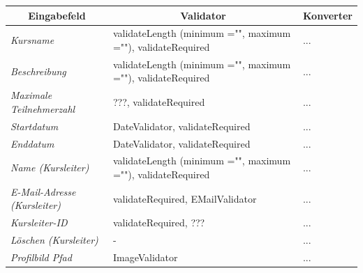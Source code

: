 \begin{itemize}
\begin{center}
\begin{longtable}{|p{3cm} |p{8cm} | p{5cm}|}
						\hline \multicolumn{1}{|c|}{\textbf{Eingabefeld}} & \multicolumn{1}{|c|}{\textbf{Validator}} & \multicolumn{1}{|c|}{\textbf{Konverter}} \\ \hline
						\endfirsthead
						\hline
						\endlastfoot
						\textit{Kursname} & validateLength (minimum ="", maximum =""), validateRequired & ... \\ \hline
						\textit{Beschreibung} & validateLength (minimum ="", maximum =""), validateRequired & ... \\ \hline
						\textit{Maximale Teilnehmerzahl} & ???, validateRequired & ... \\ \hline
						\textit{Startdatum} & DateValidator, validateRequired & ... \\ \hline
						\textit{Enddatum} & DateValidator, validateRequired & ... \\ \hline
						\textit{Name (Kursleiter)} & validateLength (minimum ="", maximum =""), validateRequired & ... \\ \hline
						\textit{E-Mail-Adresse (Kursleiter)} & validateRequired, EMailValidator & ... \\ \hline
						\textit{Kursleiter-ID} & validateRequired, ??? & ... \\ \hline
						\textit{Löschen (Kursleiter)} & - & ... \\ \hline
						\textit{Profilbild Pfad} & ImageValidator & ... \\ \hline
					\end{longtable}
				\end{center}
				

\end{itemize}

